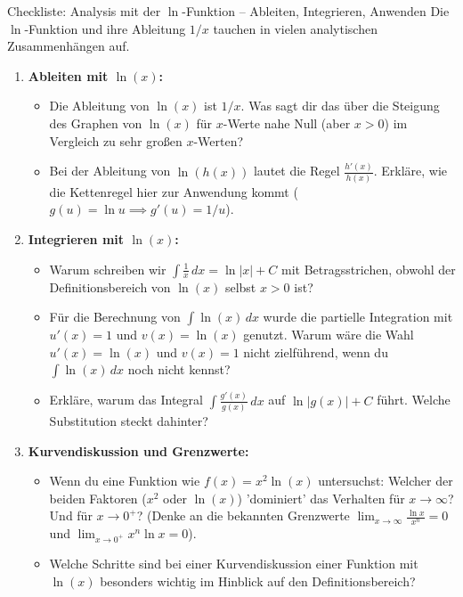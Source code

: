 \begin{aufgabenumgebung}{Checkliste: Analysis mit der $\ln$-Funktion – Ableiten, Integrieren, Anwenden}
Die $\ln$-Funktion und ihre Ableitung $1/x$ tauchen in vielen analytischen Zusammenhängen auf.

\begin{enumerate}[label=(\alph*)]
    \item \textbf{Ableiten mit $\ln(x)$:}
    \begin{itemize}
        \item Die Ableitung von $\ln(x)$ ist $1/x$. Was sagt dir das über die Steigung des Graphen von $\ln(x)$ für $x$-Werte nahe Null (aber $x>0$) im Vergleich zu sehr großen $x$-Werten?
        \item Bei der Ableitung von $\ln(h(x))$ lautet die Regel $\frac{h'(x)}{h(x)}$. Erkläre, wie die Kettenregel hier zur Anwendung kommt ($g(u)=\ln u \implies g'(u)=1/u$).
    \end{itemize}
    \item \textbf{Integrieren mit $\ln(x)$:}
    \begin{itemize}
        \item Warum schreiben wir $\int \frac{1}{x} \,dx = \ln|x|+C$ mit Betragsstrichen, obwohl der Definitionsbereich von $\ln(x)$ selbst $x>0$ ist?
        \item Für die Berechnung von $\int \ln(x) \,dx$ wurde die partielle Integration mit $u'(x)=1$ und $v(x)=\ln(x)$ genutzt. Warum wäre die Wahl $u'(x)=\ln(x)$ und $v(x)=1$ nicht zielführend, wenn du $\int \ln(x) \,dx$ noch nicht kennst?
        \item Erkläre, warum das Integral $\int \frac{g'(x)}{g(x)} \,dx$ auf $\ln|g(x)|+C$ führt. Welche Substitution steckt dahinter?
    \end{itemize}
    \item \textbf{Kurvendiskussion und Grenzwerte:}
    \begin{itemize}
        \item Wenn du eine Funktion wie $f(x)=x^2 \ln(x)$ untersuchst: Welcher der beiden Faktoren ($x^2$ oder $\ln(x)$) 'dominiert' das Verhalten für $x \to \infty$? Und für $x \to 0^+$? (Denke an die bekannten Grenzwerte $\lim_{x \to \infty} \frac{\ln x}{x^n}=0$ und $\lim_{x \to 0^+} x^n \ln x = 0$).
        \item Welche Schritte sind bei einer Kurvendiskussion einer Funktion mit $\ln(x)$ besonders wichtig im Hinblick auf den Definitionsbereich?
    \end{itemize}
\end{enumerate}
\end{aufgabenumgebung}

